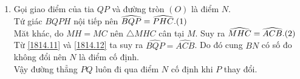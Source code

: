 \begin{ex}
{\begin{enumerate}
	\\ $\triangle AHC$ vuông tại $H$ và $M$ là trung điểm $AC$ nên $AM=MH=MC$. Suy ra $\triangle AMH$ cân tại $M$. Do đó $\widehat{AHM} =\widehat{HAM}. \refstepcounter{equation}\hfill (\theequation)\label{1814.9}$
	\\ Theo câu a) ta có $\widehat{HAC} = \widehat{BAO}$. Mặt khác $\triangle AOB$ cân tại $O$ nên $\widehat{BAO} =\widehat{ABO}$. Suy ra $\widehat{HAC} =\widehat{ABO}. \refstepcounter{equation}\hfill (\theequation)\label{1814.10}$
	\\ Từ \ref{1814.8}, \ref{1814.9} và \ref{1814.10} ta có $\widehat{ABP} =\widehat{ABO}$ nên $B,O,P$ thẳng hàng.
	\item Gọi giao điểm của tia $QP$ và đường tròn $(O)$ là điểm $N$.
	\\ Tứ giác $BQPH$ nội tiếp nên $\widehat{BQP} = \widehat{PHC}. \refstepcounter{equation}\hfill (\theequation) \label{1814.11}$
	\\ Măt khác, do $MH=MC$ nên $\triangle MHC$ cân tại $M$. Suy ra $\widehat{MHC} = \widehat{ACB}. \refstepcounter{equation}\hfill (\theequation) \label{1814.12}$
	\\ Từ \ref{1814.11} và \ref{1814.12} ta suy ra $\widehat{BQP} =\widehat{ACB}$. Do đó cung $BN$ có số đo không đổi nên $N$ là điểm cố định.
	\\ Vậy đường thẳng $PQ$ luôn đi qua điểm $N$ cố định khi $P$ thay đổi.
\end{enumerate}}
\end{ex} 

